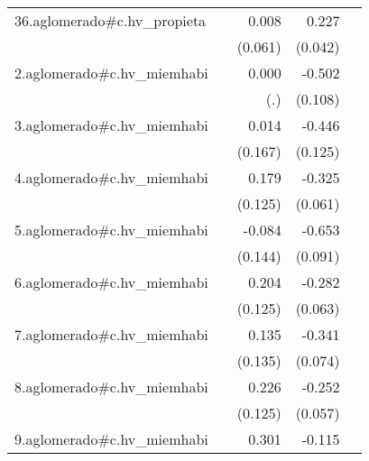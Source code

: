 {\begin{longtable}{l*{4}{D{.}{.}{-1}}}
\addlinespace
36.aglomerado#c.hv\_propieta&                     &       0.008         &       0.227\sym{***}&                     \\
            &                     &     (0.061)         &     (0.042)         &                     \\
\addlinespace
2.aglomerado#c.hv\_miemhabi&                     &       0.000         &      -0.502\sym{***}&                     \\
            &                     &         (.)         &     (0.108)         &                     \\
\addlinespace
3.aglomerado#c.hv\_miemhabi&                     &       0.014         &      -0.446\sym{***}&                     \\
            &                     &     (0.167)         &     (0.125)         &                     \\
\addlinespace
4.aglomerado#c.hv\_miemhabi&                     &       0.179         &      -0.325\sym{***}&                     \\
            &                     &     (0.125)         &     (0.061)         &                     \\
\addlinespace
5.aglomerado#c.hv\_miemhabi&                     &      -0.084         &      -0.653\sym{***}&                     \\
            &                     &     (0.144)         &     (0.091)         &                     \\
\addlinespace
6.aglomerado#c.hv\_miemhabi&                     &       0.204         &      -0.282\sym{***}&                     \\
            &                     &     (0.125)         &     (0.063)         &                     \\
\addlinespace
7.aglomerado#c.hv\_miemhabi&                     &       0.135         &      -0.341\sym{***}&                     \\
            &                     &     (0.135)         &     (0.074)         &                     \\
\addlinespace
8.aglomerado#c.hv\_miemhabi&                     &       0.226         &      -0.252\sym{***}&                     \\
            &                     &     (0.125)         &     (0.057)         &                     \\
\addlinespace
9.aglomerado#c.hv\_miemhabi&                     &       0.301\sym{*}  &      -0.115         &                     \\

\end{longtable}}
